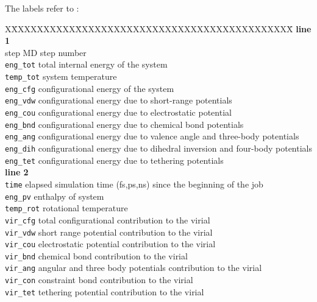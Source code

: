 The labels refer to :
\begin{tabbing}
X\=XXXXXXXXXX\=XXXXXXXXXXXXXXXXXXXXXXXXXXXXXXXXXX\=\kill
{\bf line 1}\\
\>step \> MD step number\\
\> {\tt eng\_tot} \> total internal energy of the system\\
\> {\tt temp\_tot} \> system temperature\\
\> {\tt eng\_cfg} \> configurational energy of the system\\
\> {\tt eng\_vdw} \> configurational energy due to short-range
potentials\\
\> {\tt eng\_cou} \> configurational energy due to electrostatic
potential \\
\> {\tt eng\_bnd} \> configurational energy due to chemical bond
potentials\\
\> {\tt eng\_ang} \> configurational energy due to valence angle
and three-body potentials\\
\> {\tt eng\_dih} \> configurational energy due to dihedral
inversion and four-body potentials\\
\> {\tt eng\_tet} \> configurational energy due to tethering
potentials\\
{\bf line 2}\\
\> {\tt time} \> elapsed simulation time (fs,ps,ns) since the beginning
of the job\\
\> {\tt eng\_pv} \> enthalpy of system\\
\> {\tt temp\_rot} \> rotational temperature\\
\> {\tt vir\_cfg} \> total configurational contribution to the
virial\\
\> {\tt vir\_vdw} \> short range potential contribution to the
virial\\
\> {\tt vir\_cou} \> electrostatic potential contribution to the
virial\\
\> {\tt vir\_bnd} \> chemical bond contribution to the virial\\
\> {\tt vir\_ang} \> angular and three body potentials contribution to
the virial\\
\> {\tt vir\_con} \> constraint bond contribution to the virial\\
\> {\tt vir\_tet} \> tethering potential contribution to the virial\\
\end{tabbing}

